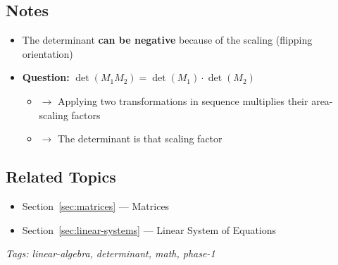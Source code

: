 \subsection{Notes}
\begin{notebox}
\begin{itemize}[nosep]
  \item The determinant \textbf{can be negative} because of the scaling (flipping orientation)
  \item \textbf{Question:} $\det(M_1 M_2) = \det(M_1) \cdot \det(M_2)$
  \begin{itemize}[nosep]
    \item $\rightarrow$ Applying two transformations in sequence multiplies their area-scaling factors
    \item $\rightarrow$ The determinant is that scaling factor
  \end{itemize}
\end{itemize}
\end{notebox}

\subsection*{Related Topics}
\begin{itemize}[nosep]
  \item Section~\ref{sec:matrices} --- Matrices
  \item Section~\ref{sec:linear-systems} --- Linear System of Equations
\end{itemize}

\bigskip
\noindent\textit{Tags: linear-algebra, determinant, math, phase-1}
